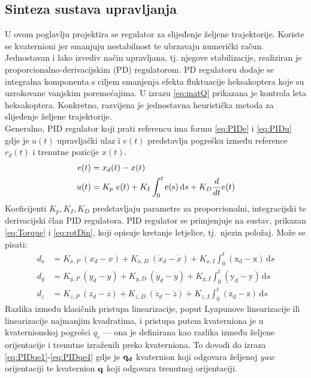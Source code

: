 \documentclass[times, utf8, diplomski]{fer}
\begin{document}
\subsection{Sinteza sustava upravljanja}
U ovom poglavlju projektira se regulator za slijeđenje željene trajektorije. Koriste se kvaternioni jer smanjuju nestabilnost te ubrzavaju numerički račun. Jednostavan i lako izvediv način upravljana, tj. njegove stabilizacije, realiziran je proporcionalno-derivacijskim (PD) regulatorom. PD regulatoru dodaje se integralna komponenta s ciljem smanjenja efekta fluktuacije  heksakoptera koje su uzrokovane vanjskim poremećajima.
U izrazu \ref{eq:matQ} prikazana je kontrola leta heksakoptera. Konkretno, razvijena je jednostavna heuristička metoda za slijeđenje željene trajektorije. \\
Generalno, PID regulator koji prati referencu ima formu \ref{eq:PIDe} i \ref{eq:PIDu} gdje je $u(t)$ upravljački ulaz i $e(t)$ predstavlja pogrešku između reference $r_d(t)$ i trenutne pozicije $x(t)$.
\begin{align}
e(t) &= x_d(t) - x(t) \label{eq:PIDe} \\
u(t) &= K_p~e(t) + K_I \int_0^t {\mathrm{e(s)}\,\mathrm{d}s} + K_D {d\over dt} e(t) \label{eq:PIDu}
\end{align}
Koeficijenti $K_p, K_I, K_D$ predstavljaju parametre za proporcionalni, integracijski te derivacijski član PID regulatora. PID regulator se primjenjuje na sustav, prikazan \ref{eq:Torque} i \ref{eq:rotDin}, koji opisuje kretanje letjelice, tj.~njezin položaj. Može se pisati:
\begin{align}
d_x &= K_{x,P}~(x_d-x)+K_{x,D}~(\dot{x}_d-\dot{x})+K_{x,I} \int_0^t {\mathrm{(x_d-x)}\,\mathrm{d}s} \label{eq:PIDdy} \\
d_y &= K_{y,P}~(y_d-y)+K_{y,D}~(\dot{y}_d-\dot{y})+K_{y,I} \int_0^t {\mathrm{(y_d-y)}\,\mathrm{d}s} \label{eq:PIDdy} \\
d_z &= K_{z,P}~(z_d-z)+K_{z,D}~(\dot{z}_d-\dot{z})+K_{z,I} \int_0^t {\mathrm{(z_d-z)}\,\mathrm{d}s} \label{eq:PIDdy}
\end{align}
Razlika između klasičnih pristupa linearizacije, poput Lyapunove linearizacije ili linearizacije najmanjim kvadratima, i pristupa putem kvaterniona je u kvaternionskoj pogrešci $q_e$ --- ona je definirana kao razlika između željene orijentacije i trenutne izraženih preko kvaterniona. To dovodi do izraza \ref{eq:PIDqe1}-\ref{eq:PIDqe4} gdje je $\bf q_d$ kvaternion koji odgovara željenoj \emph{yaw} orijentaciji te kvaternion $\bf q$ koji odgovara trenutnoj orijentaciji. 
\end{document}
